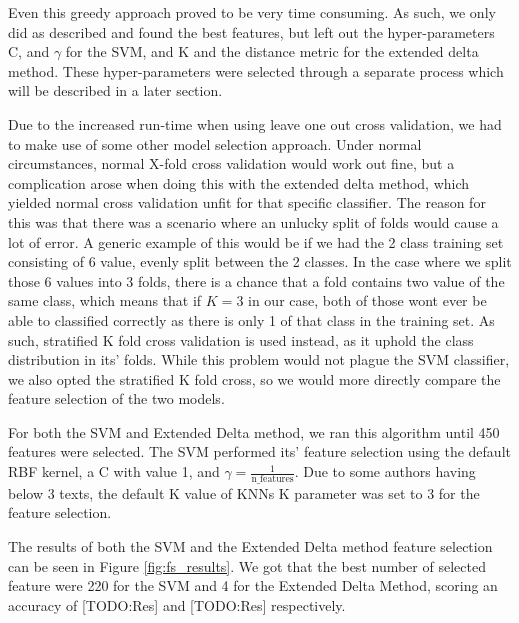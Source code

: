Even this greedy approach proved to be very time consuming. As such, we only did
as described and found the best features, but left out the hyper-parameters C,
and $\gamma$ for the SVM, and K and the distance metric for the extended delta
method. These hyper-parameters were selected through a separate process
which will be described in a later section.

Due to the increased run-time when using leave one out cross validation, we had
to make use of some other model selection approach. Under normal circumstances,
normal X-fold cross validation would work out fine, but a complication arose
when doing this with the extended delta method, which yielded normal cross
validation unfit for that specific classifier. The reason for this was that
there was a scenario where an unlucky split of folds would cause a lot of error.
A generic example of this would be if we had the 2 class training set consisting
of 6 value, evenly split between the 2 classes. In the case where we split those
6 values into 3 folds, there is a chance that a fold contains two value of the
same class, which means that if $K = 3$ in our case, both of those wont ever be
able to classified correctly as there is only 1 of that class in the training
set. As such, stratified K fold cross validation is used instead, as it uphold
the class distribution in its' folds. While this problem would not plague the
SVM classifier, we also opted the stratified K fold cross, so we would more
directly compare the feature selection of the two models.

For both the \gls{SVM} and Extended Delta method, we ran this algorithm
until 450 features were selected. The SVM performed its' feature
selection using the default RBF kernel, a C with value 1, and $\gamma =
\frac{1}{\text{n\_features}}$. Due to some authors having below 3 texts,
the default K value of \gls{KNN}s K parameter was set to 3 for the feature
selection.

The results of both the SVM and the Extended Delta method feature selection can
be seen in Figure \ref{fig:fs_results}. We got that the best number of selected
feature were 220 for the SVM and 4 for the Extended Delta Method, scoring an
accuracy of [TODO:Res] and [TODO:Res] respectively.

